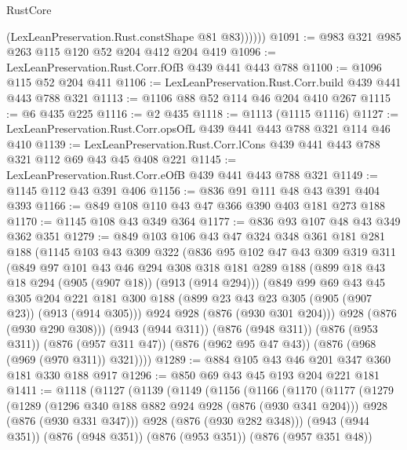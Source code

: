 \begin{lexlean}{RustCore}
\begin{coremodule}
              (LexLeanPreservation.Rust.constShape @81 @83))))))
@1091 := @983 @321 @985 @263 @115 @120 @52 @204 @412 @204 @419
@1096 := LexLeanPreservation.Rust.Corr.fOfB @439 @441 @443 @788
@1100 := @1096 @115 @52 @204 @411
@1106 := LexLeanPreservation.Rust.Corr.build @439 @441 @443 @788 @321
@1113 := @1106 @88 @52 @114 @46 @204 @410 @267
@1115 := @6 @435 @225
@1116 := @2 @435
@1118 := @1113 (@1115 @1116)
@1127 := LexLeanPreservation.Rust.Corr.opsOfL @439 @441 @443 @788 @321 @114 @46 @410
@1139 := LexLeanPreservation.Rust.Corr.lCons @439 @441 @443 @788 @321 @112 @69 @43 @45 @408 @221
@1145 := LexLeanPreservation.Rust.Corr.eOfB @439 @441 @443 @788 @321
@1149 := @1145 @112 @43 @391 @406
@1156 := @836 @91 @111 @48 @43 @391 @404 @393
@1166 := @849 @108 @110 @43 @47 @366 @390 @403 @181 @273 @188
@1170 := @1145 @108 @43 @349 @364
@1177 := @836 @93 @107 @48 @43 @349 @362 @351
@1279 := @849
    @103
    @106
    @43
    @47
    @324
    @348
    @361
    @181
    @281
    @188
    (@1145
      @103
      @43
      @309
      @322
      (@836
        @95
        @102
        @47
        @43
        @309
        @319
        @311
        (@849
          @97
          @101
          @43
          @46
          @294
          @308
          @318
          @181
          @289
          @188
          (@899 @18 @43 @18 @294 (@905 (@907 @18)) (@913 (@914 @294)))
          (@849
            @99
            @69
            @43
            @45
            @305
            @204
            @221
            @181
            @300
            @188
            (@899 @23 @43 @23 @305 (@905 (@907 @23)) (@913 (@914 @305)))
            @924
            @928
            (@876 (@930 @301 @204)))
          @928
          (@876 (@930 @290 @308)))
        (@943 (@944 @311))
        (@876 (@948 @311))
        (@876 (@953 @311))
        (@876 (@957 @311 @47))
        (@876 (@962 @95 @47 @43))
        (@876 (@968 (@969 (@970 @311)) @321))))
@1289 := @884 @105 @43 @46 @201 @347 @360 @181 @330 @188 @917
@1296 := @850 @69 @43 @45 @193 @204 @221 @181
@1411 := @1118
    (@1127
      (@1139
        (@1149
          (@1156
            (@1166
              (@1170
                (@1177
                  (@1279
                    (@1289
                      (@1296 @340 @188 @882 @924 @928 (@876 (@930 @341 @204)))
                      @928
                      (@876 (@930 @331 @347)))
                    @928
                    (@876 (@930 @282 @348)))
                  (@943 (@944 @351))
                  (@876 (@948 @351))
                  (@876 (@953 @351))
                  (@876 (@957 @351 @48))

\end{coremodule}
\end{lexlean}
